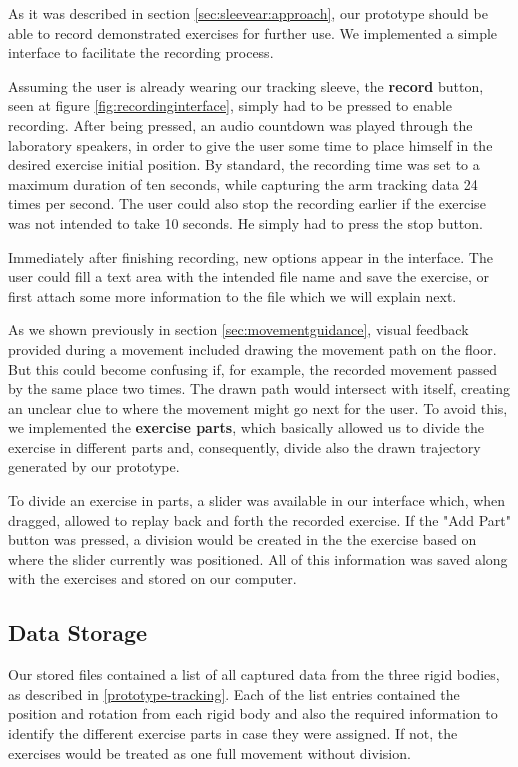 As it was described in section \ref{sec:sleevear:approach}, our prototype should be able to record demonstrated exercises for further use.
We implemented a simple interface to facilitate the recording process.

Assuming the user is already wearing our tracking sleeve, the \textbf{record} button, seen at figure \ref{fig:recordinginterface}, simply had to be pressed to enable recording. 
After being pressed, an audio countdown was played through the laboratory speakers, in order to give the user some time to place himself in the desired exercise initial position. 
By standard, the recording time was set to a maximum duration of ten seconds, while capturing the arm tracking data 24 times per second.
The user could also stop the recording earlier if the exercise was not intended to take 10 seconds. He simply had to press the stop button.

Immediately after finishing recording, new options appear in the interface. 
The user could fill a text area with the intended file name and save the exercise, or first attach some more information to the file which we will explain next.

As we shown previously in section \ref{sec:movementguidance}, visual feedback provided during a movement included drawing the movement path on the floor. 
But this could become confusing if, for example, the recorded movement passed by the same place two times. 
The drawn path would intersect with itself, creating an unclear clue to where the movement might go next for the user. 
To avoid this, we implemented the \textbf{exercise parts}, which basically allowed us to divide the exercise in different parts and, consequently, divide also the drawn trajectory generated by our prototype.

To divide an exercise in parts, a slider was available in our interface which, when dragged, allowed to replay back and forth the recorded exercise. 
If the "Add Part" button was pressed, a division would be created in the the exercise based on where the slider currently was positioned.
All of this information was saved along with the exercises and stored on our computer.



\subsection{Data Storage}

Our stored files contained a list of all captured data from the three rigid bodies, as described in \ref{prototype-tracking}. 
Each of the list entries contained the position and rotation from each rigid body and also the required information to identify the different exercise parts in case they were assigned. 
If not, the exercises would be treated as one full movement without division.

